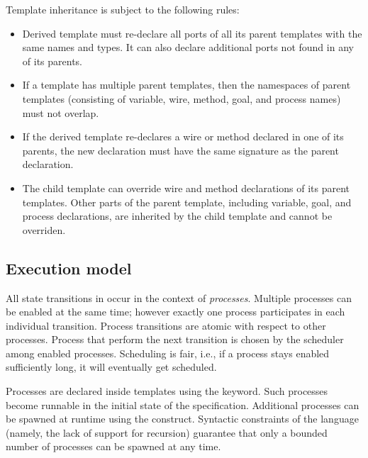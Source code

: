 Template inheritance is subject to the following rules:
\begin{itemize}
    \item Derived template must re-declare all ports of all its 
        parent templates with the same names and types.  It can 
        also declare additional ports not found in any of its 
        parents.

    \item If a template has multiple parent templates, then the 
        namespaces of parent templates (consisting of variable, 
        wire, method, goal, and process names) must not overlap.

    \item If the derived template re-declares a wire or method 
        declared in one of its parents, the new declaration must 
        have the same signature as the parent declaration.

    \item The child template can override wire and method 
        declarations of its parent templates.  Other parts of the 
        parent template, including variable, goal, and process 
        declarations, are inherited by the child template and 
        cannot be overriden.
\end{itemize}



\subsection{Execution model}\label{s:o:execmodel}

All state transitions in \tsl occur in the context of 
\emph{processes}.  Multiple processes can be enabled at the same 
time; however exactly one process participates in each individual 
transition.  Process transitions are atomic with respect to other 
processes.  Process that perform the next transition is chosen by 
the scheduler among enabled processes.  Scheduling is fair, i.e., 
if a process stays enabled sufficiently long, it will eventually 
get scheduled.

Processes are declared inside templates using the  
keyword.  Such processes become runnable in the initial state of 
the specification.  Additional processes can be spawned at runtime 
using the  construct.  Syntactic constraints of the 
language (namely, the lack of support for recursion) guarantee 
that only a bounded number of processes can be spawned at any 
time.  

